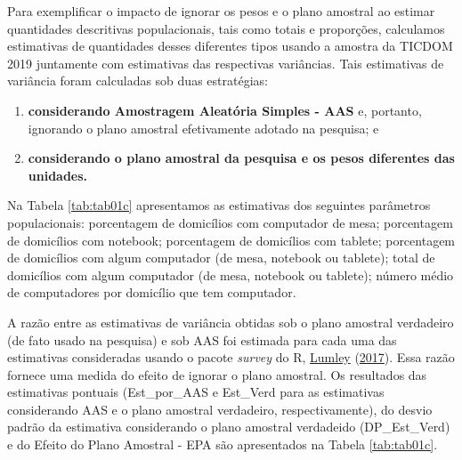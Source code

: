\documentclass[
  12pt,
  brazilian,
]{book}
\theoremstyle{definition}
\theoremstyle{definition}
\theoremstyle{definition}
\theoremstyle{definition}
\theoremstyle{remark}
\begin{document}
Para exemplificar o impacto de ignorar os pesos e o plano amostral ao estimar quantidades descritivas populacionais, tais como totais e proporções, calculamos estimativas de quantidades desses diferentes tipos usando a amostra da TICDOM 2019 juntamente com estimativas das respectivas variâncias. Tais estimativas de variância foram calculadas sob duas estratégias:

\begin{enumerate}
\def\labelenumi{\alph{enumi})}
\item
  \textbf{considerando Amostragem Aleatória Simples - AAS} e, portanto, ignorando o plano amostral efetivamente adotado na pesquisa; e
\item
  \textbf{considerando o plano amostral da pesquisa e os pesos diferentes das unidades.}
\end{enumerate}

Na Tabela \ref{tab:tab01c} apresentamos as estimativas dos seguintes parâmetros populacionais: porcentagem de domicílios com computador de mesa; porcentagem de domicílios com notebook; porcentagem de domicílios com tablete; porcentagem de domicílios com algum computador (de mesa, notebook ou tablete); total de domicílios com algum computador (de mesa, notebook ou tablete); número médio de computadores por domicílio que tem computador.

A razão entre as estimativas de variância obtidas sob o plano amostral verdadeiro (de fato usado na pesquisa) e sob AAS foi estimada para cada uma das estimativas consideradas usando o pacote \emph{survey} do R, \protect\hyperlink{ref-R-survey}{Lumley} (\protect\hyperlink{ref-R-survey}{2017}). Essa razão fornece uma medida do efeito de ignorar o plano amostral. Os resultados das estimativas pontuais (Est\_por\_AAS e Est\_Verd para as estimativas considerando AAS e o plano amostral verdadeiro, respectivamente), do desvio padrão da estimativa considerando o plano amostral verdadeido (DP\_Est\_Verd) e do Efeito do Plano Amostral - EPA são apresentados na Tabela \ref{tab:tab01c}.
\end{document}
